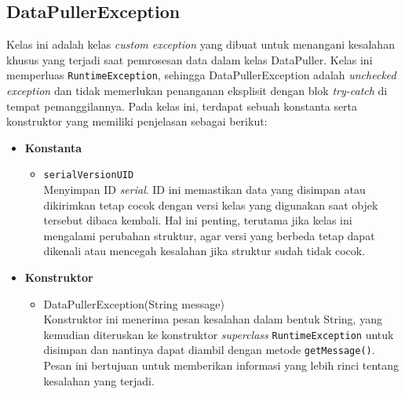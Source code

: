 \subsection{DataPullerException}
Kelas ini adalah kelas \textit{custom exception} yang dibuat untuk menangani kesalahan khusus yang terjadi saat pemrosesan data dalam kelas DataPuller. Kelas ini memperluas \texttt{RuntimeException}, sehingga DataPullerException adalah \textit{unchecked exception} dan tidak memerlukan penanganan eksplisit dengan blok \textit{try-catch} di tempat pemanggilannya. Pada kelas ini, terdapat sebuah konstanta serta konstruktor yang memiliki penjelasan sebagai berikut:
\begin{itemize}
    \item \textbf{Konstanta}
    \begin{itemize}
        \item \texttt{serialVersionUID}
        \\ Menyimpan ID \textit{serial}. ID ini memastikan data yang disimpan atau dikirimkan tetap cocok dengan versi kelas yang digunakan saat objek tersebut dibaca kembali. Hal ini penting, terutama jika kelas ini mengalami perubahan struktur, agar versi yang berbeda tetap dapat dikenali atau mencegah kesalahan jika struktur sudah tidak cocok.
    \end{itemize}
    
    \item \textbf{Konstruktor}
    \begin{itemize}
        \item DataPullerException(String message)
        \\ Konstruktor ini menerima pesan kesalahan dalam bentuk String, yang kemudian diteruskan ke konstruktor \textit{superclass} \texttt{RuntimeException} untuk disimpan dan nantinya dapat diambil dengan metode \texttt{getMessage()}. Pesan ini bertujuan untuk memberikan informasi yang lebih rinci tentang kesalahan yang terjadi.
    \end{itemize}
\end{itemize}

